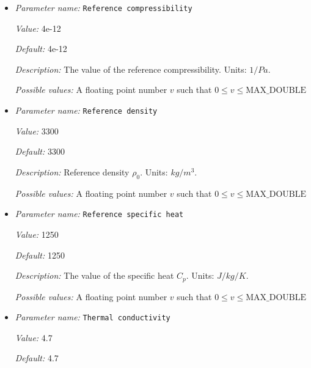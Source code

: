 \begin{itemize}
\item {\it Parameter name:} {\tt Reference compressibility}
\label{parameters:Material model/Simple compressible model/Reference compressibility}


{\it Value:} 4e-12


{\it Default:} 4e-12


{\it Description:} The value of the reference compressibility. Units: $1/Pa$.


{\it Possible values:} A floating point number $v$ such that $0 \leq v \leq \text{MAX\_DOUBLE}$
\item {\it Parameter name:} {\tt Reference density}
\label{parameters:Material model/Simple compressible model/Reference density}


{\it Value:} 3300


{\it Default:} 3300


{\it Description:} Reference density $\rho_0$. Units: $kg/m^3$.


{\it Possible values:} A floating point number $v$ such that $0 \leq v \leq \text{MAX\_DOUBLE}$
\item {\it Parameter name:} {\tt Reference specific heat}
\label{parameters:Material model/Simple compressible model/Reference specific heat}


{\it Value:} 1250


{\it Default:} 1250


{\it Description:} The value of the specific heat $C_p$. Units: $J/kg/K$.


{\it Possible values:} A floating point number $v$ such that $0 \leq v \leq \text{MAX\_DOUBLE}$
\item {\it Parameter name:} {\tt Thermal conductivity}
\label{parameters:Material model/Simple compressible model/Thermal conductivity}


{\it Value:} 4.7


{\it Default:} 4.7



\end{itemize}
